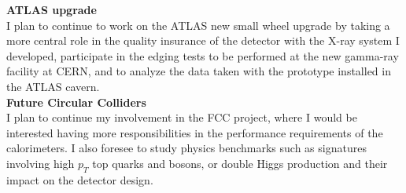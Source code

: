 \documentclass[12pt]{article}
\begin{document}



\noindent
{\bf ATLAS upgrade}\\
I plan to continue to work on the ATLAS new small wheel upgrade by taking a more central role in the quality insurance of the detector with the X-ray system I developed, 
participate in the edging tests to be performed at the new gamma-ray facility at CERN, and to analyze the data taken with the prototype installed in the ATLAS cavern.\\

\noindent
{\bf Future Circular Colliders}\\
I plan to continue my involvement in the FCC project, where I would be interested having more responsibilities in the performance requirements of the calorimeters.
I also foresee to study physics benchmarks such as signatures involving high $p_T$ top quarks and bosons, or double Higgs production 
and their impact on the detector design.

\end{document}
